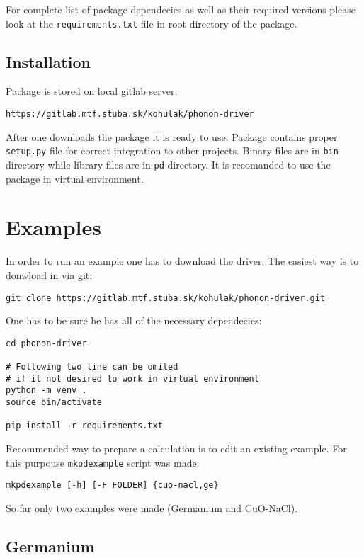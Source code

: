 \documentclass[12pt]{article}
\begin{document}
For complete list of package dependecies as well as their required versions please look at the \texttt{requirements.txt} file in root directory of the package. 

\subsection{Installation}

Package is stored on local gitlab server:
\begin{verbatim}
https://gitlab.mtf.stuba.sk/kohulak/phonon-driver
\end{verbatim}
After one downloads the package it is ready to use. Package contains proper \texttt{setup.py} file for correct integration to other projects. Binary files are in \texttt{bin} directory while library files are in \texttt{pd} directory. It is recomanded to use the package in virtual environment.

\section{Examples}

In order to run an example one has to download the driver. The easiest way is to donwload in via git:

\begin{verbatim}
git clone https://gitlab.mtf.stuba.sk/kohulak/phonon-driver.git
\end{verbatim}

One has to be sure he has all of the necessary dependecies:

\begin{verbatim}
cd phonon-driver

# Following two line can be omited 
# if it not desired to work in virtual environment
python -m venv .
source bin/activate

pip install -r requirements.txt
\end{verbatim}

Recommended way to prepare a calculation is to edit an existing example. For this purpouse \texttt{mkpdexample} script was made:

\begin{verbatim}
mkpdexample [-h] [-F FOLDER] {cuo-nacl,ge}
\end{verbatim}

So far only two examples were made (Germanium and CuO-NaCl).

\subsection{Germanium}
\end{document}
